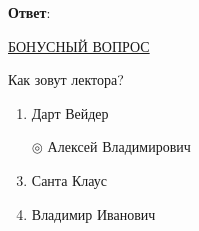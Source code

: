 \textbf{Ответ}: 

\task
\underline{БОНУСНЫЙ ВОПРОС}

Как зовут лектора?

\begin{enumerate}[label=$\circ$]
	\item Дарт Вейдер
	\item[$\circledcirc$] Алексей Владимирович
	\item Санта Клаус
	\item Владимир Иванович
\end{enumerate}